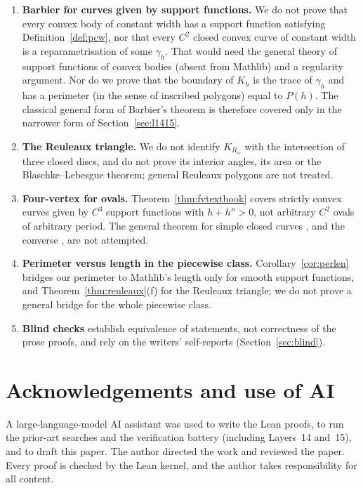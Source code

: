 \documentclass[11pt]{article}
\theoremstyle{definition}
\theoremstyle{remark}
\begin{document}
\begin{enumerate}
\item \textbf{Barbier for curves given by support functions.} We do not prove that every convex body of
constant width has a support function satisfying Definition~\ref{def:pcw}, nor that every $C^2$ closed
convex curve of constant width is a reparametrisation of some $\gamma_h$. That would need the
general theory of support functions of convex bodies (absent from Mathlib) and a regularity argument.
Nor do we prove that the boundary of $K_h$ is the trace of $\gamma_h$ and has a perimeter (in the
sense of inscribed polygons) equal to $P(h)$. The classical general form of Barbier's theorem is
therefore covered only in the narrower form of Section~\ref{sec:l1415}.
\item \textbf{The Reuleaux triangle.} We do not identify $K_{R_w}$ with the intersection of three
closed discs, and do not prove its interior angles, its area or the Blaschke--Lebesgue theorem;
general Reuleaux polygons are not treated.
\item \textbf{Four-vertex for ovals.} Theorem~\ref{thm:fvtextbook} covers strictly convex curves
given by $C^3$ support functions with $h+h''>0$, not arbitrary $C^2$ ovals of arbitrary period. The general theorem for simple closed curves
\cite{kneser1912}, and the converse \cite{dahlberg2005}, are not attempted.
\item \textbf{Perimeter versus length in the piecewise class.} Corollary~\ref{cor:perlen} bridges our
perimeter to Mathlib's length only for smooth support functions, and Theorem~\ref{thm:reuleaux}(f) for
the Reuleaux triangle; we do not prove a general bridge for the whole piecewise class.
\item \textbf{Blind checks} establish equivalence of statements, not correctness of the prose
proofs, and rely on the writers' self-reports (Section~\ref{sec:blind}).
\end{enumerate}

\section*{Acknowledgements and use of AI}
A large-language-model AI assistant was used to write the Lean proofs, to run the prior-art searches
and the verification battery (including Layers~14 and~15), and to draft this paper. The author directed the work and reviewed the
paper. Every proof is checked by the Lean kernel, and the author takes responsibility for all content.
\end{document}
